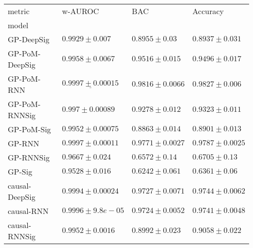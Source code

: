 \begin{tabular}{llll}
\toprule
metric &                                          w-AUROC &                                             BAC &                                        Accuracy \\
model          &                                                  &                                                 &                                                 \\
\midrule
GP-DeepSig     &                             $ 0.9929 \pm 0.007 $ &                             $ 0.8955 \pm 0.03 $ &                            $ 0.8937 \pm 0.031 $ \\
GP-PoM-DeepSig &                            $ 0.9958 \pm 0.0067 $ &                            $ 0.9516 \pm 0.015 $ &                            $ 0.9496 \pm 0.017 $ \\
GP-PoM-RNN     &            $  \underline{ 0.9997 \pm 0.00015 } $ &               $  \mathbf{ 0.9816 \pm 0.0066 } $ &                $  \mathbf{ 0.9827 \pm 0.006 } $ \\
GP-PoM-RNNSig  &                            $ 0.997 \pm 0.00089 $ &                            $ 0.9278 \pm 0.012 $ &                            $ 0.9323 \pm 0.011 $ \\
GP-PoM-Sig     &                           $ 0.9952 \pm 0.00075 $ &                            $ 0.8863 \pm 0.014 $ &                            $ 0.8901 \pm 0.013 $ \\
GP-RNN         &                           $ 0.9997 \pm 0.00011 $ &                           $ 0.9771 \pm 0.0027 $ &                           $ 0.9787 \pm 0.0025 $ \\
GP-RNNSig      &                             $ 0.9667 \pm 0.024 $ &                             $ 0.6572 \pm 0.14 $ &                             $ 0.6705 \pm 0.13 $ \\
GP-Sig         &                             $ 0.9528 \pm 0.016 $ &                            $ 0.6242 \pm 0.061 $ &                             $ 0.6361 \pm 0.06 $ \\
causal-DeepSig &                           $ 0.9994 \pm 0.00024 $ &                           $ 0.9727 \pm 0.0071 $ &                           $ 0.9744 \pm 0.0062 $ \\
causal-RNN     &                           $ 0.9996 \pm 9.8e-05 $ &                           $ 0.9724 \pm 0.0052 $ &                           $ 0.9741 \pm 0.0048 $ \\
causal-RNNSig  &                            $ 0.9952 \pm 0.0016 $ &                            $ 0.8992 \pm 0.023 $ &                            $ 0.9058 \pm 0.022 $ \\

\end{tabular}
